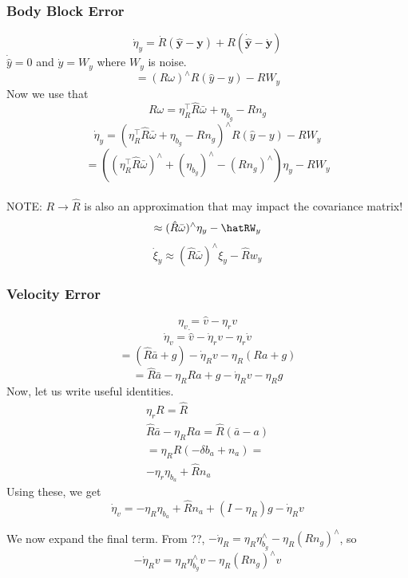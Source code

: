 \subsubsection{Body Block Error}
\begin{equation}
\dot \eta_y = \dot R(\hat{\mathbf{y}} - \mathbf{y}) + R(\dot{\hat{\mathbf{y}}} - \dot{\mathbf{y}})

\end{equation}
  $\dot \hat y = 0$ and $\dot y = W_y$ where $W_y$ is noise. 
  \begin{equation}
=(R\omega)^\wedge R(\hat y-y)-RW_y
  \end{equation}
  Now we use that $$R\omega = \eta_R^\top{\hat R\bar{\omega}}_{{}} + \eta_{b_g} - R{n}_g$$
$$\dot \eta_y = (\eta_R^\top{\hat R\bar{\omega}} + \eta_{b_g} - R{n}_g)^\wedge R(\hat y - y)-RW_y$$
$$= ((\eta_R^\top{\hat R\bar{\omega}})^\wedge + (\eta_{b_g}  )^\wedge -(R{n}_g)^\wedge)\eta_y-RW_y$$\\
NOTE: $R \to \hat R$ is also an approximation that may impact the covariance matrix!
$$\approx(\hat R \bar \omega)^\wedge \eta_y-\hatRW_y$$
$$\dot \xi_y \approx (\hat R \bar \omega)^\wedge \xi_y-\hat R w_y$$
\subsubsection{Velocity Error}
$$\eta_v = \hat v - \eta_r v$$
$$\dot \eta_v = \dot \hat v - \dot \eta_r v - \eta_r \dot v$$
$$
= (\hat R\bar{{a}} + {g}) - \dot\eta_R{v} - \eta_R(R{a} + {g})
$$
$$=\hat R \bar a - \eta_R Ra+g-\dot \eta_Rv - \eta_R g$$
Now, let us write useful identities. 
\begin{equation}
  \begin{aligned}
  \eta_r R = \hat R\\
  \hat R \bar a -\eta_R R a = \hat R(\bar a - a)\\
   = \eta_R R(-\delta b_a + n_a)=\\
   -\eta_r \eta_{b_a}+\hat R n_a
  \end{aligned}

\end{equation}
Using these, we get 
$$\dot \eta_v = -\eta_R \eta_{b_a}+\hat R n_a +(I-\eta_R)g-\dot \eta_R v $$

We now expand the final term. From ??,
$-\dot\eta_R = \eta_R\eta_{b_g}^\wedge - \eta_R(R{n}_g)^\wedge$, so
\begin{equation}
  -\dot\eta_R{v}
    = \eta_R\eta_{b_g}^\wedge{v} - \eta_R(R{n}_g)^\wedge{v}
\end{equation}

